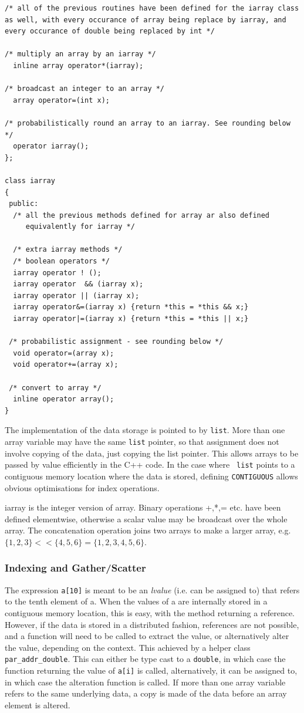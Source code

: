 \begin{verbatim}
/* all of the previous routines have been defined for the iarray class
as well, with every occurance of array being replace by iarray, and
every occurance of double being replaced by int */

/* multiply an array by an iarray */
  inline array operator*(iarray);

/* broadcast an integer to an array */
  array operator=(int x);

/* probabilistically round an array to an iarray. See rounding below */
  operator iarray();
};  

class iarray
{
 public:
  /* all the previous methods defined for array ar also defined
     equivalently for iarray */

  /* extra iarray methods */
  /* boolean operators */
  iarray operator ! ();
  iarray operator  && (iarray x);
  iarray operator || (iarray x);
  iarray operator&=(iarray x) {return *this = *this && x;}
  iarray operator|=(iarray x) {return *this = *this || x;}

 /* probabilistic assignment - see rounding below */
  void operator=(array x);    
  void operator+=(array x);  

 /* convert to array */
  inline operator array();
}

\end{verbatim}

The implementation of the data storage is pointed to by
\verb|list|. More than one array variable may have the same
\verb|list| pointer, so that assignment does not involve copying of
the data, just copying the list pointer. This allows arrays to be
passed by value efficiently in the C++ code. In the case where {\tt
  list} points to a contiguous memory location where the data is
stored, defining {\tt CONTIGUOUS} allows obvious optimisations for
index operations.

iarray is the integer version of array. Binary operations +,*,=
etc. have been defined elementwise, otherwise a scalar value may be
broadcast over the whole array. The concatenation operation joins two
arrays to make a larger array, e.g. $\{1,2,3\} << \{4,5,6\} =
\{1,2,3,4,5,6\}$. 

\subsubsection{Indexing and Gather/Scatter}

The expression \verb|a[10]| is meant to be an {\em lvalue} (i.e. can
be assigned to) that refers to the tenth element of a. When the values
of a are internally stored in a contiguous memory location, this is
easy, with the method returning a reference. However, if the data is
stored in a distributed fashion, references are not possible, and a
function will need to be called to extract the value, or alternatively
alter the value, depending on the context. This achieved by a helper
class \verb|par_addr_double|. This can either be type cast to a
\verb|double|, in which case the function returning the value of
\verb|a[i]| is called, alternatively, it can be assigned to, in which
case the alteration function is called. If more than one array
variable refers to the same underlying data, a copy is made of the
data before an array element is altered.

